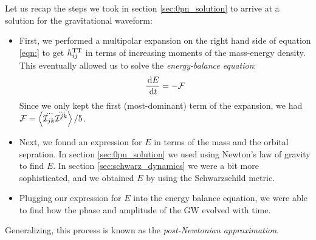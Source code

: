 Let us recap the steps we took in section \ref{sec:0pn_solution} to arrive at a solution for the gravitational waveform:
\begin{itemize}
\item{First, we performed a multipolar expansion on the right hand side of equation \ref{eqn:} to get $h^{\mathrm{TT}}_{ij}$ in terms of increasing moments of the mass-energy density. This eventually allowed us to solve the \emph{energy-balance equation}:
\begin{equation}
\label{eqn:energy_balance}
\frac{\d E}{\d t} = -\mathcal{F}
\end{equation}
Since we only kept the first (most-dominant) term of the expansion, we had $\mathcal{F} = \left<\dddot{\mathcal{I}_{jk}}\dddot{\mathcal{I}^{jk}}\right>/5$.}
\item{Next, we found an expression for $E$ in terms of the mass and the orbital sepration. In section \ref{sec:0pn_solution} we used using Newton's law of gravity to find $E$. In section \ref{sec:schwarz_dynamics} we were a bit more sophisticated, and we obtained $E$ by using the Schwarzschild metric.}
\item{Plugging our expression for $E$ into the energy balance equation, we were able to find how the phase and amplitude of the \ac{GW} evolved with time.}
\end{itemize}
Generalizing, this process is known as the \emph{post-Newtonian approximation}.

